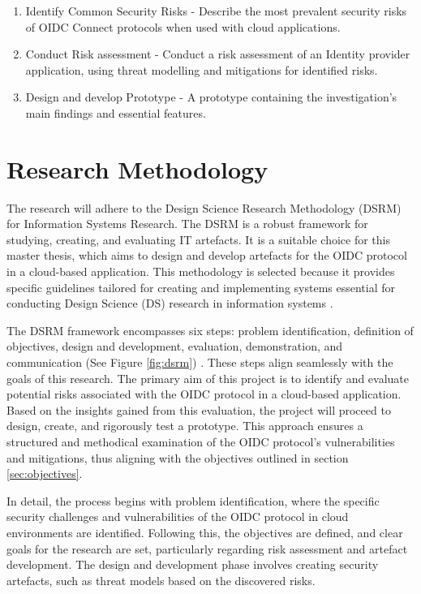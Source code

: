 \begin{enumerate}
  \item Identify Common Security Risks - Describe the most prevalent security risks of OIDC Connect protocols when used with cloud applications.
  \item Conduct Risk assessment  - Conduct a risk assessment of an Identity provider application, using threat modelling and mitigations for identified risks.
  \item Design and develop Prototype - A prototype containing the investigation's main findings and essential features.
\end{enumerate}

\section{Research Methodology}
The research will adhere to the Design Science Research Methodology (DSRM) for Information Systems Research. The DSRM is a robust framework for studying, creating, and evaluating IT artefacts. It is a suitable choice for this master thesis, which aims to design and develop artefacts for the OIDC protocol in a cloud-based application. This methodology is selected because it provides specific guidelines tailored for creating and implementing systems essential for conducting Design Science (DS) research in information systems \citep{dsrm}.

The DSRM framework encompasses six steps: problem identification, definition of objectives, design and development, evaluation, demonstration, and communication (See Figure \ref{fig:dsrm}) \citep{dsrm}. These steps align seamlessly with the goals of this research. The primary aim of this project is to identify and evaluate potential risks associated with the OIDC protocol in a cloud-based application. Based on the insights gained from this evaluation, the project will proceed to design, create, and rigorously test a prototype. This approach ensures a structured and methodical examination of the OIDC protocol’s vulnerabilities and mitigations, thus aligning with the objectives outlined in section \ref{sec:objectives}.

In detail, the process begins with problem identification, where the specific security challenges and vulnerabilities of the OIDC protocol in cloud environments are identified. Following this, the objectives are defined, and clear goals for the research are set, particularly regarding risk assessment and artefact development. The design and development phase involves creating security artefacts, such as threat models based on the discovered risks.

